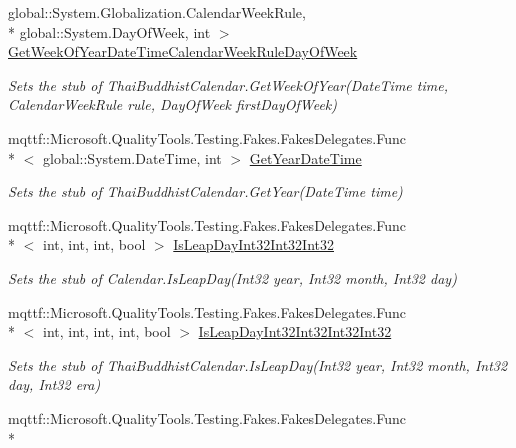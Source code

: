 \begin{DoxyCompactItemize}
global\-::\-System.\-Globalization.\-Calendar\-Week\-Rule, \\*
global\-::\-System.\-Day\-Of\-Week, int $>$ \hyperlink{class_system_1_1_globalization_1_1_fakes_1_1_stub_thai_buddhist_calendar_a04d31ad8b4458dfcd1e2d540c82e7cf3}{Get\-Week\-Of\-Year\-Date\-Time\-Calendar\-Week\-Rule\-Day\-Of\-Week}
\begin{DoxyCompactList}\small\item\em Sets the stub of Thai\-Buddhist\-Calendar.\-Get\-Week\-Of\-Year(\-Date\-Time time, Calendar\-Week\-Rule rule, Day\-Of\-Week first\-Day\-Of\-Week)\end{DoxyCompactList}\item 
mqttf\-::\-Microsoft.\-Quality\-Tools.\-Testing.\-Fakes.\-Fakes\-Delegates.\-Func\\*
$<$ global\-::\-System.\-Date\-Time, int $>$ \hyperlink{class_system_1_1_globalization_1_1_fakes_1_1_stub_thai_buddhist_calendar_a299542d817be4fa85c999e4bde09050b}{Get\-Year\-Date\-Time}
\begin{DoxyCompactList}\small\item\em Sets the stub of Thai\-Buddhist\-Calendar.\-Get\-Year(\-Date\-Time time)\end{DoxyCompactList}\item 
mqttf\-::\-Microsoft.\-Quality\-Tools.\-Testing.\-Fakes.\-Fakes\-Delegates.\-Func\\*
$<$ int, int, int, bool $>$ \hyperlink{class_system_1_1_globalization_1_1_fakes_1_1_stub_thai_buddhist_calendar_a0e4564325d91216d018a1f7267d7e3b5}{Is\-Leap\-Day\-Int32\-Int32\-Int32}
\begin{DoxyCompactList}\small\item\em Sets the stub of Calendar.\-Is\-Leap\-Day(\-Int32 year, Int32 month, Int32 day)\end{DoxyCompactList}\item 
mqttf\-::\-Microsoft.\-Quality\-Tools.\-Testing.\-Fakes.\-Fakes\-Delegates.\-Func\\*
$<$ int, int, int, int, bool $>$ \hyperlink{class_system_1_1_globalization_1_1_fakes_1_1_stub_thai_buddhist_calendar_ae00bb20d1fa4d30dcc00090898ba6d7d}{Is\-Leap\-Day\-Int32\-Int32\-Int32\-Int32}
\begin{DoxyCompactList}\small\item\em Sets the stub of Thai\-Buddhist\-Calendar.\-Is\-Leap\-Day(\-Int32 year, Int32 month, Int32 day, Int32 era)\end{DoxyCompactList}\item 
mqttf\-::\-Microsoft.\-Quality\-Tools.\-Testing.\-Fakes.\-Fakes\-Delegates.\-Func\\*

\end{DoxyCompactItemize}
